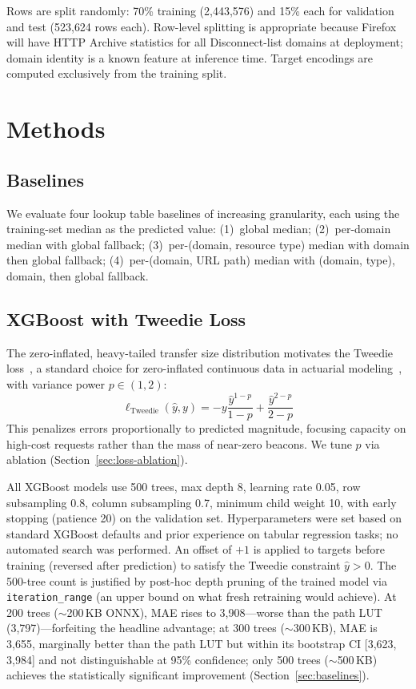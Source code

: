 \documentclass[sigconf,nonacm]{acmart}
\newcommand{\numtrainrows}{2{,}443{,}576\xspace}
\newcommand{\numtestrows}{523{,}624\xspace}
\begin{document}
Rows are split randomly: 70\% training (\numtrainrows) and 15\% each for validation and test (\numtestrows rows each).
Row-level splitting is appropriate because Firefox will have HTTP Archive statistics for all Disconnect-list domains at deployment; domain identity is a known feature at inference time.
Target encodings are computed exclusively from the training split.

\section{Methods}
\label{sec:methods}

\subsection{Baselines}
\label{sec:baselines-method}

We evaluate four lookup table baselines of increasing granularity, each using the training-set median as the predicted value:
(1)~global median;
(2)~per-domain median with global fallback;
(3)~per-(domain, resource type) median with domain then global fallback;
(4)~per-(domain, URL path) median with (domain, type), domain, then global fallback.

\subsection{XGBoost with Tweedie Loss}

The zero-inflated, heavy-tailed transfer size distribution motivates the Tweedie loss~\cite{jorgensen1987exponential}, a standard choice for zero-inflated continuous data in actuarial modeling~\cite{smyth2002tweedie,wuthrich2008stochastic}, with variance power $p \in (1,2)$:
\[
\ell_\text{Tweedie}(\hat{y}, y) = -y \frac{\hat{y}^{1-p}}{1-p} + \frac{\hat{y}^{2-p}}{2-p}
\]
This penalizes errors proportionally to predicted magnitude, focusing capacity on high-cost requests rather than the mass of near-zero beacons.
We tune $p$ via ablation (Section~\ref{sec:loss-ablation}).

All XGBoost models use 500 trees, max depth 8, learning rate 0.05, row subsampling 0.8, column subsampling 0.7, minimum child weight 10, with early stopping (patience 20) on the validation set. Hyperparameters were set based on standard XGBoost defaults and prior experience on tabular regression tasks; no automated search was performed.
An offset of $+1$ is applied to targets before training (reversed after prediction) to satisfy the Tweedie constraint $\hat{y} > 0$.
The 500-tree count is justified by post-hoc depth pruning of the trained model via \texttt{iteration\_range} (an upper bound on what fresh retraining would achieve).
At 200 trees ($\sim$200\,KB ONNX), MAE rises to 3{,}908---worse than the path LUT (3{,}797)---forfeiting the headline advantage; at 300 trees ($\sim$300\,KB), MAE is 3{,}655, marginally better than the path LUT but within its bootstrap CI [3{,}623, 3{,}984] and not distinguishable at 95\% confidence; only 500 trees ($\sim$500\,KB) achieves the statistically significant improvement (Section~\ref{sec:baselines}).
\end{document}
